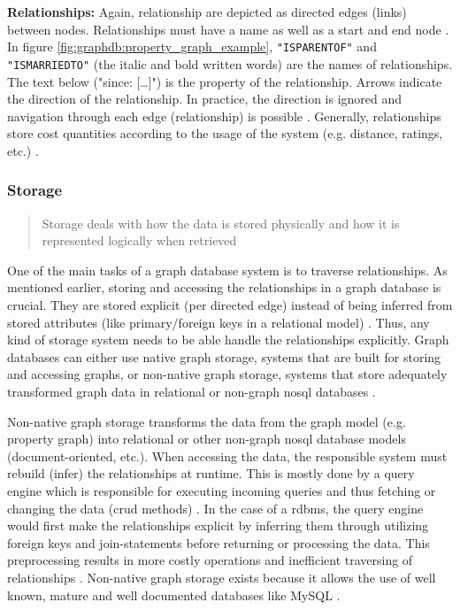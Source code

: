 \textbf{Relationships:} Again, relationship are depicted as directed edges (links) between nodes. Relationships must have a name as well as a start and end node \autocite{graphdb2015} . In figure \ref{fig:graphdb:property_graph_example}, \texttt{"IS\textunderscore PARENT\textunderscore OF"} and \texttt{"IS\textunderscore MARRIED\textunderscore TO"} (the italic and bold written words) are the names of relationships. The text below ("since: […]") is the property of the relationship. Arrows indicate the direction of the relationship.  In practice, the direction is ignored and navigation through each edge (relationship) is possible \autocite{maheshlal2015, neo4j:graphdb}. Generally, relationships store cost quantities according to the usage of the system (e.g. distance, ratings, etc.) \autocite{neo4j:graphdb}.

\subsubsection{Storage}
\blockquote{Storage deals with how the data is stored physically and how it is represented logically when retrieved}\autocite{maheshlal2015}

One of the main tasks of a graph database system is to traverse relationships. As mentioned earlier, storing and accessing the relationships in a graph database is crucial. They are stored explicit (per directed edge) instead of being inferred from stored attributes (like primary/foreign keys in a relational model) \autocite{maheshlal2015} . Thus, any kind of storage system needs to be able handle the relationships explicitly. Graph databases can either use native graph storage, systems that are built for storing and accessing graphs, or non-native graph storage, systems that store adequately transformed graph data in relational or non-graph \gls{nosql} databases \autocite{graphdb2015}.


Non-native graph storage transforms the data from the graph model (e.g. property graph) into relational or other non-graph \gls{nosql} database models (document-oriented, etc.). When accessing the data, the responsible system must rebuild (infer) the relationships at runtime. This is mostly done by a query engine which is responsible for executing incoming queries and thus fetching or changing the data (\gls{crud} methods) \autocite{maheshlal2015} . In the case of a \gls{rdbms}, the query engine would first make the relationships explicit by inferring them through utilizing foreign keys and join-statements before returning or processing the data. This preprocessing results in more costly operations and inefficient traversing of relationships \autocite{maheshlal2015}. Non-native graph storage exists because it allows the use of well known, mature and well documented databases like MySQL \autocite{graphdb2015}.

